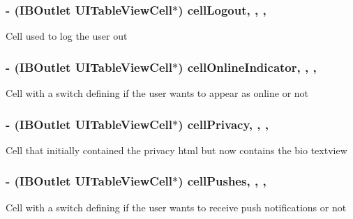\subsubsection[{cell\+Logout}]{\setlength{\rightskip}{0pt plus 5cm}-\/ (I\+B\+Outlet U\+I\+Table\+View\+Cell$\ast$) cell\+Logout\hspace{0.3cm}{\ttfamily [read]}, {\ttfamily [write]}, {\ttfamily [nonatomic]}, {\ttfamily [strong]}}\label{category_e_s_settings_view_07_08_a44497b402b0eaf22eaaabc34059d3690}
Cell used to log the user out \hypertarget{category_e_s_settings_view_07_08_a5fba80efa79471671331b5418d2bfd60}{}
\subsubsection[{cell\+Online\+Indicator}]{\setlength{\rightskip}{0pt plus 5cm}-\/ (I\+B\+Outlet U\+I\+Table\+View\+Cell$\ast$) cell\+Online\+Indicator\hspace{0.3cm}{\ttfamily [read]}, {\ttfamily [write]}, {\ttfamily [nonatomic]}, {\ttfamily [strong]}}\label{category_e_s_settings_view_07_08_a5fba80efa79471671331b5418d2bfd60}
Cell with a switch defining if the user wants to appear as online or not \hypertarget{category_e_s_settings_view_07_08_a54641bc5342c531fc56d4b0d478d3d92}{}
\subsubsection[{cell\+Privacy}]{\setlength{\rightskip}{0pt plus 5cm}-\/ (I\+B\+Outlet U\+I\+Table\+View\+Cell$\ast$) cell\+Privacy\hspace{0.3cm}{\ttfamily [read]}, {\ttfamily [write]}, {\ttfamily [nonatomic]}, {\ttfamily [strong]}}\label{category_e_s_settings_view_07_08_a54641bc5342c531fc56d4b0d478d3d92}
Cell that initially contained the privacy html but now contains the bio textview \hypertarget{category_e_s_settings_view_07_08_aea2e270b3e0dc217c754e06d13af1630}{}
\subsubsection[{cell\+Pushes}]{\setlength{\rightskip}{0pt plus 5cm}-\/ (I\+B\+Outlet U\+I\+Table\+View\+Cell$\ast$) cell\+Pushes\hspace{0.3cm}{\ttfamily [read]}, {\ttfamily [write]}, {\ttfamily [nonatomic]}, {\ttfamily [strong]}}\label{category_e_s_settings_view_07_08_aea2e270b3e0dc217c754e06d13af1630}
Cell with a switch defining if the user wants to receive push notifications or not \hypertarget{category_e_s_settings_view_07_08_a882b94f63ca9dc1f83033b8614df7c4d}{}
